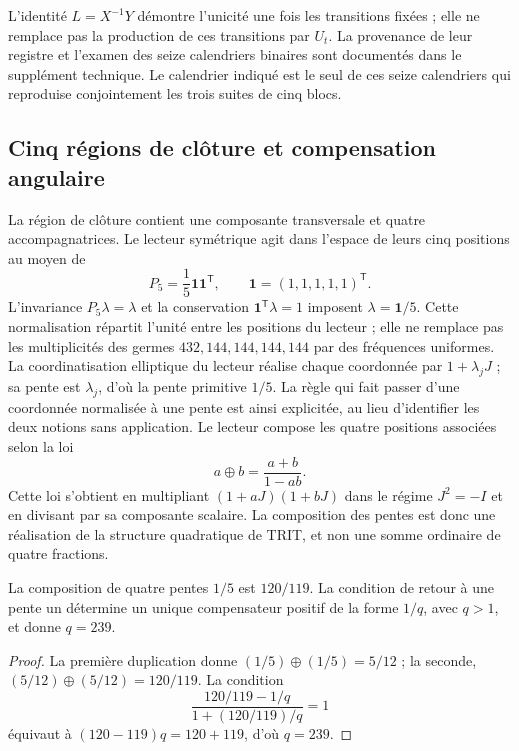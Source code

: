 L'identité \(L=X^{-1}Y\) démontre l'unicité une fois les transitions fixées ; elle ne remplace pas la production de ces transitions par \(U_t\). La provenance de leur registre et l'examen des seize calendriers binaires sont documentés dans le supplément technique. Le calendrier indiqué est le seul de ces seize calendriers qui reproduise conjointement les trois suites de cinq blocs.



\subsection{Cinq régions de clôture et compensation angulaire}

La région de clôture contient une composante transversale et quatre accompagnatrices. Le lecteur symétrique agit dans l'espace de leurs cinq positions au moyen de
\[
 P_5=\frac15\mathbf1\mathbf1^{\mathsf T},\qquad
 \mathbf1=(1,1,1,1,1)^{\mathsf T}.
\]
L'invariance \(P_5\lambda=\lambda\) et la conservation \(\mathbf1^{\mathsf T}\lambda=1\) imposent \(\lambda=\mathbf1/5\). Cette normalisation répartit l'unité entre les positions du lecteur ; elle ne remplace pas les multiplicités des germes \(432,144,144,144,144\) par des fréquences uniformes. La coordinatisation elliptique du lecteur réalise chaque coordonnée par \(1+\lambda_jJ\) ; sa pente est \(\lambda_j\), d'où la pente primitive \(1/5\). La règle qui fait passer d'une coordonnée normalisée à une pente est ainsi explicitée, au lieu d'identifier les deux notions sans application. Le lecteur compose les quatre positions associées selon la loi
\begin{equation}
 a\oplus b=\frac{a+b}{1-ab}.
 \label{eq:suma-pendientes}
\end{equation}
Cette loi s'obtient en multipliant \((1+aJ)(1+bJ)\) dans le régime \(J^2=-I\) et en divisant par sa composante scalaire. La composition des pentes est donc une réalisation de la structure quadratique de TRIT, et non une somme ordinaire de quatre fractions.

\begin{proposition}
La composition de quatre pentes \(1/5\) est \(120/119\). La condition de retour à une pente un détermine un unique compensateur positif de la forme \(1/q\), avec \(q>1\), et donne \(q=239\).
\end{proposition}
\begin{proof}
La première duplication donne \((1/5)\oplus(1/5)=5/12\) ; la seconde, \((5/12)\oplus(5/12)=120/119\). La condition
\[
 \frac{120/119-1/q}{1+(120/119)/q}=1
\]
équivaut à \((120-119)q=120+119\), d'où \(q=239\).
\end{proof}

